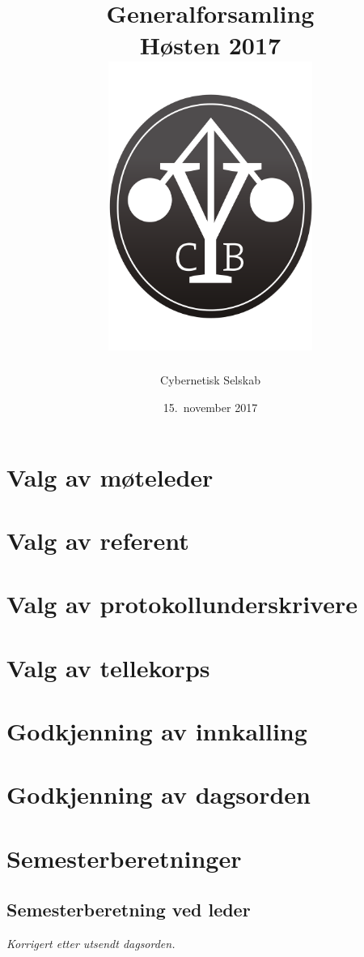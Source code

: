 \documentclass[10pt,norsk,a4paper]{article}
\title{Generalforsamling \\
	Høsten 2017\\[3cm]
	\includegraphics[width=0.5\textwidth]{cyblogoa3.pdf}\\[-.5cm]}
\date{15.\ november 2017}
\author{Cybernetisk Selskab}
\begin{document}
\maketitle{}
\newpage
\tableofcontents{}


\section{Valg av møteleder}

\section{Valg av referent}

\section{Valg av protokollunderskrivere}

\section{Valg av tellekorps}

\section{Godkjenning av innkalling}

\section{Godkjenning av dagsorden}

\section{Semesterberetninger}
\subsection{Semesterberetning ved leder}
\textit{\small Korrigert etter utsendt dagsorden.}
\end{document}
